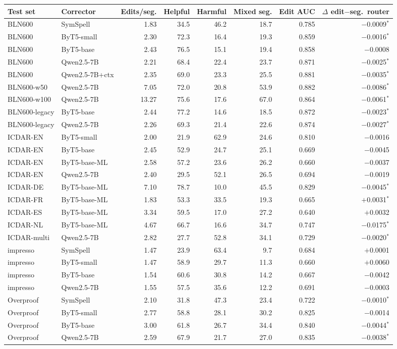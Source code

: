 \begin{tabular}{llrrrrrr}
\toprule
Test set & Corrector & Edits/seg. & Helpful & Harmful & Mixed seg. & Edit AUC & $\Delta$ edit$-$seg.\ router \\
\midrule
BLN600 & SymSpell & 1.83 & 34.5 & 46.2 & 18.7 & 0.785 & $-$0.0009$^{*}$ \\
BLN600 & ByT5-small & 2.30 & 72.3 & 16.4 & 19.3 & 0.859 & $-$0.0016$^{*}$ \\
BLN600 & ByT5-base & 2.43 & 76.5 & 15.1 & 19.4 & 0.858 & $-$0.0008 \\
BLN600 & Qwen2.5-7B & 2.21 & 68.4 & 22.4 & 23.7 & 0.871 & $-$0.0025$^{*}$ \\
BLN600 & Qwen2.5-7B+ctx & 2.35 & 69.0 & 23.3 & 25.5 & 0.881 & $-$0.0035$^{*}$ \\
BLN600-w50 & Qwen2.5-7B & 7.05 & 72.0 & 20.8 & 53.9 & 0.882 & $-$0.0086$^{*}$ \\
BLN600-w100 & Qwen2.5-7B & 13.27 & 75.6 & 17.6 & 67.0 & 0.864 & $-$0.0061$^{*}$ \\
BLN600-legacy & ByT5-base & 2.44 & 77.2 & 14.6 & 18.5 & 0.872 & $-$0.0023$^{*}$ \\
BLN600-legacy & Qwen2.5-7B & 2.26 & 69.3 & 21.4 & 22.6 & 0.874 & $-$0.0027$^{*}$ \\
ICDAR-EN & ByT5-small & 2.00 & 21.9 & 62.9 & 24.6 & 0.810 & $-$0.0016 \\
ICDAR-EN & ByT5-base & 2.45 & 52.9 & 24.7 & 25.1 & 0.669 & $-$0.0045 \\
ICDAR-EN & ByT5-base-ML & 2.58 & 57.2 & 23.6 & 26.2 & 0.660 & $-$0.0037 \\
ICDAR-EN & Qwen2.5-7B & 2.40 & 29.5 & 52.1 & 26.5 & 0.694 & $-$0.0019 \\
ICDAR-DE & ByT5-base-ML & 7.10 & 78.7 & 10.0 & 45.5 & 0.829 & $-$0.0045$^{*}$ \\
ICDAR-FR & ByT5-base-ML & 1.83 & 53.3 & 33.5 & 19.3 & 0.665 & $+$0.0031$^{*}$ \\
ICDAR-ES & ByT5-base-ML & 3.34 & 59.5 & 17.0 & 27.2 & 0.640 & $+$0.0032 \\
ICDAR-NL & ByT5-base-ML & 4.67 & 66.7 & 16.6 & 34.7 & 0.747 & $-$0.0175$^{*}$ \\
ICDAR-multi & Qwen2.5-7B & 2.82 & 27.7 & 52.8 & 34.1 & 0.729 & $-$0.0020$^{*}$ \\
impresso & SymSpell & 1.47 & 23.9 & 63.4 & 9.7 & 0.684 & $+$0.0001 \\
impresso & ByT5-small & 1.47 & 58.9 & 29.7 & 11.3 & 0.660 & $+$0.0060 \\
impresso & ByT5-base & 1.54 & 60.6 & 30.8 & 14.2 & 0.667 & $-$0.0042 \\
impresso & Qwen2.5-7B & 1.55 & 57.5 & 35.6 & 12.2 & 0.691 & $-$0.0003 \\
Overproof & SymSpell & 2.10 & 31.8 & 47.3 & 23.4 & 0.722 & $-$0.0010$^{*}$ \\
Overproof & ByT5-small & 2.77 & 58.8 & 28.1 & 30.2 & 0.825 & $-$0.0014 \\
Overproof & ByT5-base & 3.00 & 61.8 & 26.7 & 34.4 & 0.840 & $-$0.0044$^{*}$ \\
Overproof & Qwen2.5-7B & 2.59 & 67.9 & 21.7 & 27.0 & 0.835 & $-$0.0038$^{*}$ \\
\bottomrule
\end{tabular}
